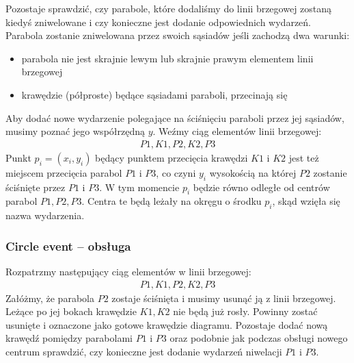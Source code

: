 \documentclass[declaration,shortabstract, inz]{iithesis}
\theoremstyle{definition} \newtheorem{definition}{Definicja}[]
\theoremstyle{plain} \newtheorem{remark}[definition]{Obserwacja}
\theoremstyle{plain} \newtheorem{theorem}[definition]{Twierdzenie}
\theoremstyle{plain} \newtheorem{example}{Przykład}[definition]
\theoremstyle{plain} \newtheorem{lemma}[definition]{Lemat}
\begin{document}
Pozostaje sprawdzić, czy parabole, które dodaliśmy do linii brzegowej zostaną kiedyś zniwelowane i czy konieczne jest dodanie odpowiednich wydarzeń. 
Parabola zostanie zniwelowana przez swoich sąsiadów jeśli zachodzą dwa warunki:
\begin{itemize}
	\item parabola nie jest skrajnie lewym lub skrajnie prawym elementem linii brzegowej
	\item krawędzie (półproste) będące sąsiadami paraboli, przecinają się
\end{itemize}
Aby dodać nowe wydarzenie polegające na ściśnięciu paraboli przez jej sąsiadów, musimy poznać jego współrzędną $y$. 
Weźmy ciąg elementów linii brzegowej:
\begin{align}
	P1, K1, P2, K2, P3
\end{align}
Punkt $p_i = (x_i, y_i)$ będący punktem przecięcia krawędzi $K1$ i $K2$ jest też miejscem przecięcia parabol $P1$ i $P3$, co czyni $y_i$
wysokością na której $P2$ zostanie ściśnięte przez $P1$ i $P3$. W tym momencie $p_i$ będzie równo odległe od centrów parabol $P1, P2, P3$. Centra te będą leżały na okręgu o środku $p_i$, skąd wzięła się nazwa wydarzenia.


\subsubsection{Circle event -- obsługa}
\label{sec:circle}
Rozpatrzmy następujący ciąg elementów w linii brzegowej:
\begin{align}
	P1, K1, P2, K2, P3
\end{align}
Załóżmy, że parabola $P2$ zostaje ściśnięta i musimy usunąć ją z linii brzegowej. Leżące po jej bokach krawędzie $K1, K2$ nie będą już rosły. Powinny zostać usunięte i oznaczone jako gotowe krawędzie diagramu. Pozostaje dodać nową krawędź pomiędzy parabolami $P1$ i $P3$ oraz podobnie jak podczas obsługi nowego centrum sprawdzić, czy konieczne jest dodanie wydarzeń niwelacji $P1$ i $P3$.
\end{document}

